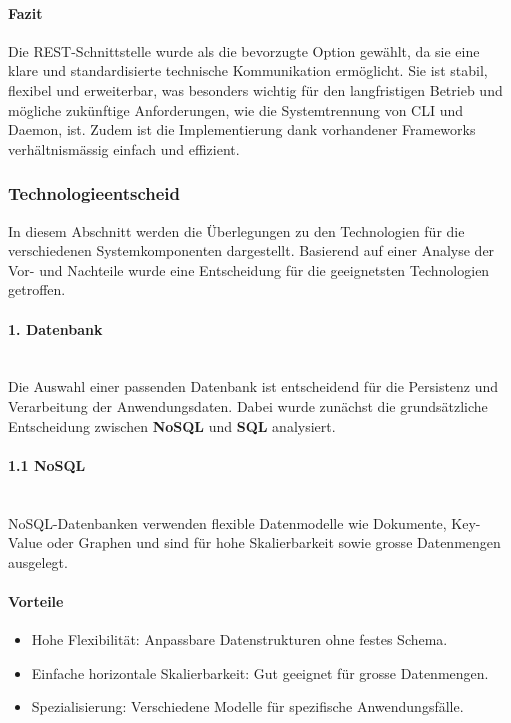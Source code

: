 \documentclass[a4paper,12pt]{report}
\begin{document}
    \paragraph*{Fazit}
    Die REST-Schnittstelle wurde als die bevorzugte Option gewählt, da sie eine klare und standardisierte technische Kommunikation ermöglicht.
    Sie ist stabil, flexibel und erweiterbar, was besonders wichtig für den langfristigen Betrieb und mögliche zukünftige Anforderungen, wie die Systemtrennung von CLI und Daemon, ist.
    Zudem ist die Implementierung dank vorhandener Frameworks verhältnismässig einfach und effizient.
    \clearpage

    \subsubsection{Technologieentscheid}\label{subsubsec:technologieentscheid}
    In diesem Abschnitt werden die Überlegungen zu den Technologien für die verschiedenen Systemkomponenten dargestellt.
    Basierend auf einer Analyse der Vor- und Nachteile wurde eine Entscheidung für die geeignetsten Technologien getroffen.

    \paragraph*{1. Datenbank}\mbox{}\\
    Die Auswahl einer passenden Datenbank ist entscheidend für die Persistenz und Verarbeitung der Anwendungsdaten.
    Dabei wurde zunächst die grundsätzliche Entscheidung zwischen \textbf{NoSQL} und \textbf{SQL} analysiert.

    \paragraph*{1.1 NoSQL}\mbox{}\\
    NoSQL-Datenbanken verwenden flexible Datenmodelle wie Dokumente, Key-Value oder Graphen und sind für hohe Skalierbarkeit sowie grosse Datenmengen ausgelegt.

    \paragraph*{Vorteile}
    \begin{itemize}
        \item Hohe Flexibilität: Anpassbare Datenstrukturen ohne festes Schema.
        \item Einfache horizontale Skalierbarkeit: Gut geeignet für grosse Datenmengen.
        \item Spezialisierung: Verschiedene Modelle für spezifische Anwendungsfälle.
    \end{itemize}
\end{document}
